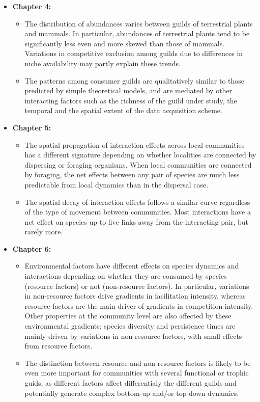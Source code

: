 \begin{itemize}
\begin{itemize}
  \end{itemize}
  \item \textbf{Chapter 4:}
  \begin{itemize}
    \item The distribution of abundances varies between guilds of terrestrial plants and mammals. In particular, abundances of terrestrial plants tend to be significantly less even and more skewed than those of mammals. Variations in competitive exclusion among guilds due to differences in niche availability may partly explain these trends.
    \item The patterns among consumer guilds are qualitatively similar to those predicted by simple theoretical models, and are mediated by other interacting factors such as the richness of the guild under study, the temporal and the spatial extent of the data acquisition scheme.
  \end{itemize}
  \item \textbf{Chapter 5:}
  \begin{itemize}
    \item The spatial propagation of interaction effects across local communities has a different signature depending on whether localities are connected by dispersing or foraging organisms. When local communities are connected by foraging, the net effects between any pair of species are much less predictable from local dynamics than in the dispersal case.
    \item The spatial decay of interaction effects follows a similar curve regardless of the type of movement between communities. Most interactions have a net effect on species up to five links away from the interacting pair, but rarely more.
  \end{itemize}
  \item \textbf{Chapter 6:}
  \begin{itemize}
    \item Environmental factors have different effects on species dynamics and interactions depending on whether they are consumed by species (resource factors) or not (non-resource factors). In particular, variations in non-resource factors drive gradients in facilitation intensity, whereas resource factors are the main driver of gradients in competition intensity. Other properties at the community level are also affected by these environmental gradients: species diversity and persistence times are mainly driven by variations in non-resource factors, with small effects from resource factors.
    \item The distinction between resource and non-resource factors is likely to be even more important for communities with several functional or trophic guids, as different factors affect differentialy the different guilds and potentially generate complex bottom-up and/or top-down dynamics.
  \end{itemize}
\end{itemize}
